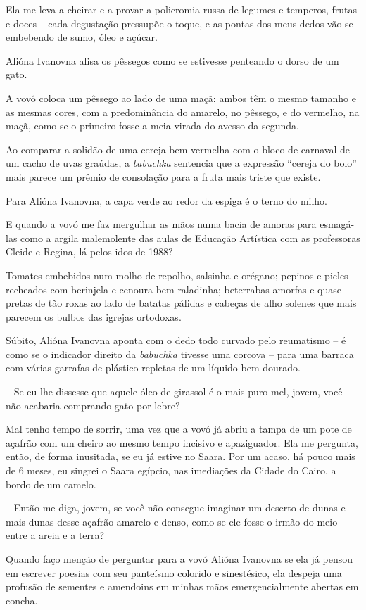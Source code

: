Ela me leva a cheirar e a provar a policromia russa de legumes e
temperos, frutas e doces -- cada degustação pressupõe o toque, e as
pontas dos meus dedos vão se embebendo de sumo, óleo e açúcar.

Alióna Ivanovna alisa os pêssegos como se estivesse penteando o dorso de
um gato.

A vovó coloca um pêssego ao lado de uma maçã: ambos têm o mesmo tamanho
e as mesmas cores, com a predominância do amarelo, no pêssego, e do
vermelho, na maçã, como se o primeiro fosse a meia virada do avesso da
segunda.

Ao comparar a solidão de uma cereja bem vermelha com o bloco de carnaval
de um cacho de uvas graúdas, a \emph{babuchka} sentencia que a expressão
``cereja do bolo'' mais parece um prêmio de consolação para a fruta mais
triste que existe.

Para Alióna Ivanovna, a capa verde ao redor da espiga é o terno do
milho.

E quando a vovó me faz mergulhar as mãos numa bacia de amoras para
esmagá-las como a argila malemolente das aulas de Educação Artística com
as professoras Cleide e Regina, lá pelos idos de 1988?

Tomates embebidos num molho de repolho, salsinha e orégano; pepinos e
picles recheados com berinjela e cenoura bem raladinha; beterrabas
amorfas e quase pretas de tão roxas ao lado de batatas pálidas e cabeças
de alho solenes que mais parecem os bulbos das igrejas ortodoxas.

Súbito, Alióna Ivanovna aponta com o dedo todo curvado pelo reumatismo
-- é como se o indicador direito da \emph{babuchka} tivesse uma corcova
-- para uma barraca com várias garrafas de plástico repletas de um
líquido bem dourado.

-- Se eu lhe dissesse que aquele óleo de girassol é o mais puro mel,
jovem, você não acabaria comprando gato por lebre?

Mal tenho tempo de sorrir, uma vez que a vovó já abriu a tampa de um
pote de açafrão com um cheiro ao mesmo tempo incisivo e apaziguador. Ela
me pergunta, então, de forma inusitada, se eu já estive no Saara. Por um
acaso, há pouco mais de 6 meses, eu singrei o Saara egípcio, nas
imediações da Cidade do Cairo, a bordo de um camelo.

-- Então me diga, jovem, se você não consegue imaginar um deserto de
dunas e mais dunas desse açafrão amarelo e denso, como se ele fosse o
irmão do meio entre a areia e a terra?

Quando faço menção de perguntar para a vovó Alióna Ivanovna se ela já
pensou em escrever poesias com seu panteísmo colorido e sinestésico, ela
despeja uma profusão de sementes e amendoins em minhas mãos
emergencialmente abertas em concha.

